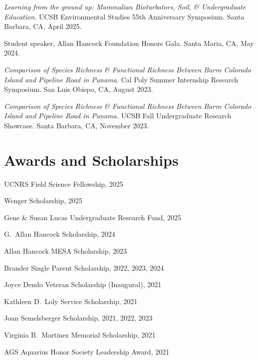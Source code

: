 \documentclass[letterpaper]{article}
\newenvironment{biblist}{%
   \begin{list}{}{%
     \setlength{\labelwidth}{0pt}%
     \setlength{\labelsep}{1em}%
     \setlength{\leftmargin}{2em}%
     \setlength{\itemindent}{-1em}%
   }
}{\end{list}}
\begin{document}
\begin{biblist}
\item \textit{Learning from the ground up: Mammalian Bioturbators, Soil, \& Undergraduate Education.} UCSB Environmental Studies 55th Anniversary Symposium. Santa Barbara, CA, April 2025.
  
\item Student speaker, Allan Hancock Foundation Honors Gala. Santa Maria, CA, May 2024.

\item \textit{Comparison of Species Richness \& Functional Richness Between Barro Colorado Island and Pipeline Road in Panama.} Cal Poly Summer Internship Research Symposium. San Luis Obispo, CA, August 2023.

\item \textit{Comparison of Species Richness \& Functional Richness Between Barro Colorado Island and Pipeline Road in Panama.} UCSB Fall Undergraduate Research Showcase. Santa Barbara, CA, November 2023.
\end{biblist}


\section*{Awards and Scholarships}

\begin{biblist}
\item UCNRS Field Science Fellowship, 2025
\item Wenger Scholarship, 2025
\item Gene \& Susan Lucas Undergraduate Research Fund, 2025
\item G.\ Allan Hancock Scholarship, 2024
\item Allan Hancock MESA Scholarship, 2023
\item Brander Single Parent Scholarship, 2022, 2023, 2024
\item Joyce Dendo Veteran Scholarship (Inaugural), 2021
\item Kathleen D.\ Loly Service Scholarship, 2021
\item Joan Semelsberger Scholarship, 2021, 2022, 2023
\item Virginia B.\ Martinez Memorial Scholarship, 2021
\item AGS Aquarius Honor Society Leadership Award, 2021
\end{biblist}
\end{document}

